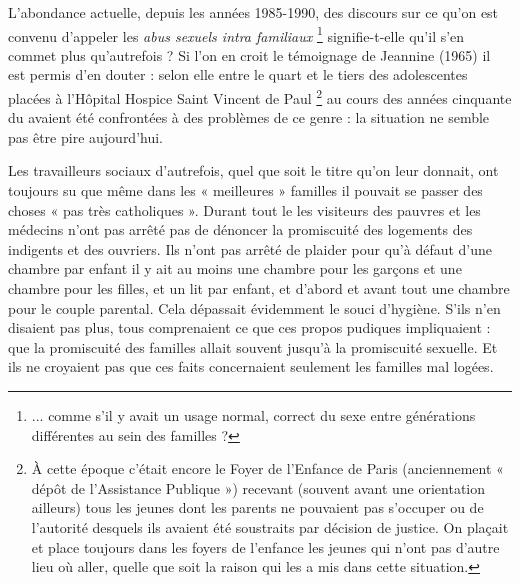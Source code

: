 

 L'abondance actuelle, depuis les années 1985-1990, des discours sur ce qu'on est convenu d'appeler les \emph{abus sexuels intra familiaux}%
\footnote{... comme s'il y avait un usage normal, correct du sexe entre générations différentes au sein des familles ?} 
signifie-t-elle qu'il s'en commet plus qu'autrefois ? Si l'on en croit le témoignage de Jeannine  (1965) il est permis d'en douter : selon elle entre le quart et le tiers des adolescentes placées à l'Hôpital Hospice Saint Vincent de Paul%
\footnote{À cette époque c'était encore le Foyer de l'Enfance de Paris (anciennement « dépôt de l'Assistance Publique ») recevant (souvent avant une orientation ailleurs) tous les jeunes dont les parents ne pouvaient pas s'occuper ou de l'autorité desquels ils avaient été soustraits par décision de justice. On plaçait et place toujours dans les foyers de l'enfance les jeunes qui n'ont pas d'autre lieu où aller, quelle que soit la raison qui les a mis dans cette situation.} 
 au cours des années cinquante du  avaient été confrontées à des problèmes de ce genre : la situation ne semble pas être pire aujourd'hui. 

 Les travailleurs sociaux d'autrefois, quel que soit le titre qu'on leur donnait, ont toujours su que même dans les « meilleures » familles il pouvait se passer des choses « pas très catholiques ». Durant tout le  les visiteurs des pauvres et les médecins n'ont pas arrêté pas de dénoncer la promiscuité des logements des indigents et des ouvriers. Ils n'ont pas arrêté de plaider pour qu'à défaut d'une chambre par enfant il y ait au moins une chambre pour les garçons et une chambre pour les filles, et un lit par enfant, et d'abord et avant tout une chambre pour le couple parental. Cela dépassait évidemment le souci d'hygiène. S'ils n'en disaient pas plus, tous comprenaient ce que ces propos pudiques impliquaient : que la promiscuité des familles allait souvent jusqu'à la promiscuité sexuelle. Et ils ne croyaient pas que ces faits concernaient seulement les familles mal logées. 


